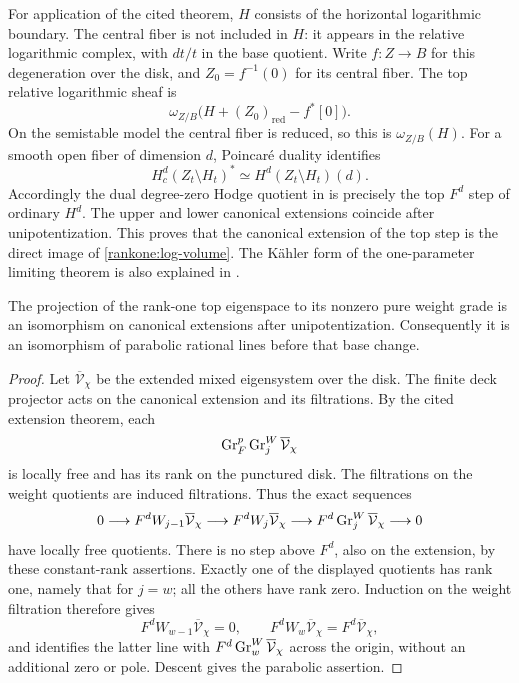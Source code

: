 For application of the cited theorem, $H$ consists of the horizontal
logarithmic boundary.  The central fiber is not included in $H$:
it appears in the relative logarithmic complex, with $dt/t$ in the
base quotient.  Write $f:Z\to B$ for this degeneration over the disk,
and $Z_0=f^{-1}(0)$ for its central fiber.  The top relative
logarithmic sheaf is
\begin{equation}\label{rankone:log-volume}
 \omega_{Z/B}\bigl(H+(Z_0)_{\mathrm{red}}-f^*[0]\bigr).
\end{equation}
On the semistable model the central fiber is reduced, so this is
$\omega_{Z/B}(H)$.  For a smooth open fiber of dimension $d$,
Poincar\'e duality identifies
\[
 H^d_c(Z_t\setminus H_t)^*\simeq
 H^d(Z_t\setminus H_t)(d).
\]
Accordingly the dual degree-zero Hodge quotient in
\cite[Theorem~1.1(iv)]{FujinoFujisawaVMHS} is precisely the top
$F^d$ step of ordinary $H^d$.  The upper and lower canonical
extensions coincide after unipotentization.  This proves that the
canonical extension of the top step is the direct image of
\eqref{rankone:log-volume}.  The K\"ahler form of the
one-parameter limiting theorem is also explained in
\cite[Remarks~2.16, 4.4, and~4.8]{FujinoFujisawaVMHS}.

\begin{lemma}\label{rankone:extension}
The projection of the rank-one top eigenspace to its nonzero pure
weight grade is an isomorphism on canonical extensions after
unipotentization.  Consequently it is an isomorphism of parabolic
rational lines before that base change.
\end{lemma}

\begin{proof}
Let $\overline{\mathcal V}_\chi$ be the extended mixed eigensystem
over the disk.  The finite deck projector acts on the canonical
extension and its filtrations.  By the cited extension theorem,
each
\[
 \operatorname{Gr}_F^p\operatorname{Gr}^W_j\overline{\mathcal V}_\chi
\]
is locally free and has its rank on the punctured disk.  The
filtrations on the weight quotients are induced filtrations.
Thus the exact sequences
\[
 0\longrightarrow F^dW_{j-1}\overline{\mathcal V}_\chi
 \longrightarrow F^dW_j\overline{\mathcal V}_\chi
 \longrightarrow F^d\operatorname{Gr}^W_j\overline{\mathcal V}_\chi
 \longrightarrow0
\]
have locally free quotients.  There is no step above $F^d$, also
on the extension, by these constant-rank assertions.  Exactly one
of the displayed quotients has rank one, namely that for $j=w$;
all the others have rank zero.  Induction on the weight filtration
therefore gives
\[
 F^dW_{w-1}\overline{\mathcal V}_\chi=0,\qquad
 F^dW_w\overline{\mathcal V}_\chi
   =F^d\overline{\mathcal V}_\chi,
\]
and identifies the latter line with
$F^d\operatorname{Gr}^W_w\overline{\mathcal V}_\chi$ across the origin, without
an additional zero or pole.  Descent gives the parabolic assertion.
\end{proof}

